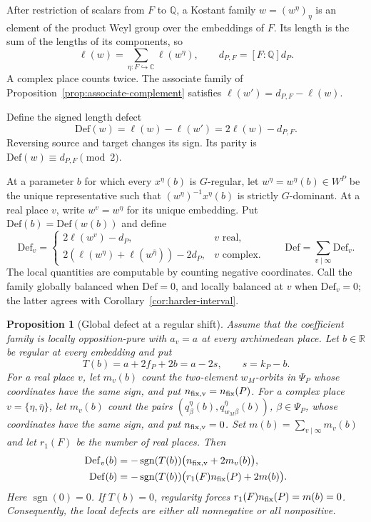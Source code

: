 \documentclass[12pt]{amsart}
\numberwithin{equation}{section}
\theoremstyle{plain}
\newtheorem{proposition}[theorem]{Proposition}
\theoremstyle{definition}
\theoremstyle{remark}
\renewcommand{\bar}{\overline}
\newcommand{\Q}{\mathbb Q}
\newcommand{\C}{\mathbb C}
\newcommand{\Def}{\mathrm{Def}}
\begin{document}
After restriction of scalars from $F$ to $\Q$, a Kostant family $w=(w^\eta)_\eta$ is an element of the product Weyl group over the embeddings of $F$. Its length is the sum of the lengths of its components, so  
\[
 \ell(w)=\sum_{\eta:F\hookrightarrow\C}\ell(w^\eta),\qquad
 d_{P,F}=[F:\Q]d_P.
\]
A complex place counts twice. The associate family of Proposition~\ref{prop:associate-complement} satisfies $\ell(w')=d_{P,F}-\ell(w)$.

Define the signed length defect
\begin{equation}\label{eq:defect}
 \Def(w)=\ell(w)-\ell(w')=2\ell(w)-d_{P,F}.
\end{equation}
Reversing source and target changes its sign. Its parity is $\Def(w)\equiv d_{P,F}\pmod2$.

At a parameter $b$ for which every $x^\eta(b)$ is $G$-regular, let $w^\eta=w^\eta(b)\in W^P$ be the unique representative such that $(w^\eta)^{-1}x^\eta(b)$ is strictly $G$-dominant. At a real place $v$, write $w^v=w^\eta$ for its unique embedding. Put $\Def(b)=\Def(w(b))$ and define
\begin{equation}\label{eq:local-defect}
 \Def_v=\begin{cases}
  2\ell(w^v)-d_P,&v\text{ real},\\
  2(\ell(w^\eta)+\ell(w^{\bar\eta}))-2d_P,&v\text{ complex}.
 \end{cases}
 \qquad\Def=\sum_{v\mid\infty}\Def_v .
\end{equation}
The local quantities are computable by counting negative coordinates. Call the family globally balanced when $\Def=0$, and locally balanced at $v$ when $\Def_v=0$; the latter agrees with Corollary~\ref{cor:harder-interval}.

\begin{proposition}[Global defect at a regular shift] \label{prop:global-defect}
Assume that the coefficient family is locally opposition-pure with $a_v=a$ at every archimedean place. Let $b\in\mathbb R$ be regular at every embedding and put 
\[
 T(b)=a+2f_P+2b=a-2s,\qquad s=k_P-b.
\]
For a real place $v$, let $m_v(b)$ count the two-element $w_M$-orbits in $\Psi_P$ whose coordinates have the same sign, and put $n_{\rm fix,v}=n_{\rm fix}(P)$. For a complex place $v=\{\eta,\bar\eta\}$, let $m_v(b)$ count the pairs $(q_\beta^\eta(b),q_{w_M\beta}^{\bar\eta}(b))$, $\beta\in\Psi_P$, whose coordinates have the same sign, and put $n_{\rm fix,v}=0$. Set $m(b)=\sum_{v\mid\infty}m_v(b)$ and let $r_1(F)$ be the number of real places. Then
\begin{equation}\label{eq:regular-defect-count}
\begin{aligned}
  \Def_v(b) &= -\operatorname{sgn}(T(b))\bigl(n_{\rm fix,v}+2m_v(b)\bigr),\\
  \Def(b)   &= -\operatorname{sgn}(T(b))\bigl(r_1(F)n_{\rm fix}(P)+2m(b)\bigr).
\end{aligned}
\end{equation}
Here $\operatorname{sgn}(0)=0$. If $T(b)=0$, regularity forces $r_1(F)n_{\rm fix}(P)=m(b)=0$. Consequently, the local defects are either all nonnegative or all nonpositive. 
\end{proposition}
\end{document}
